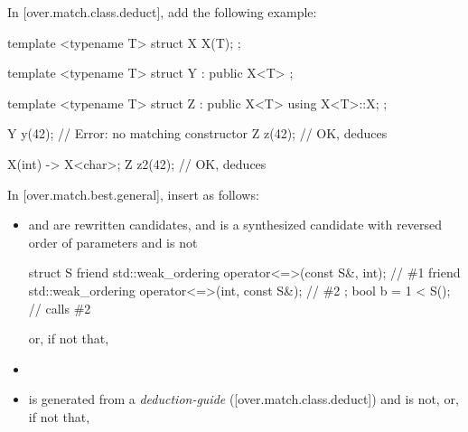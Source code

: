 In [over.match.class.deduct], add the following example:

\begin{adjustwidth}{0.5cm}{0.5cm}
\begin{addedblock}
\begin{example}
\begin{codeblock}
template <typename T> struct X {
  X(T);
};

template <typename T> struct Y : public X<T> {};

template <typename T> struct Z : public X<T> {
  using X<T>::X;
};

Y y(42);  // Error: no matching constructor
Z z(42);  // OK, deduces 

X(int) -> X<char>;
Z z2(42); // OK, deduces 
\end{codeblock}
\end{example}
\end{addedblock}
\end{adjustwidth}

In [over.match.best.general], insert as follows:

\begin{adjustwidth}{0cm}{0.5cm}
\begin{itemize}
\item
{} and  are rewritten candidates, and
 is a synthesized candidate
with reversed order of parameters
and  is not
\begin{example}
\begin{codeblock}
struct S {
  friend std::weak_ordering operator<=>(const S&, int);         // \#1
  friend std::weak_ordering operator<=>(int, const S&);         // \#2
};
bool b = 1 < S();                                               // calls \#2
\end{codeblock}
\end{example}
or, if not that,


\item {}

\item
{} is generated from a
\emph{deduction-guide} ([over.match.class.deduct])
and  is not, or, if not that,
\end{itemize}
\end{adjustwidth}

